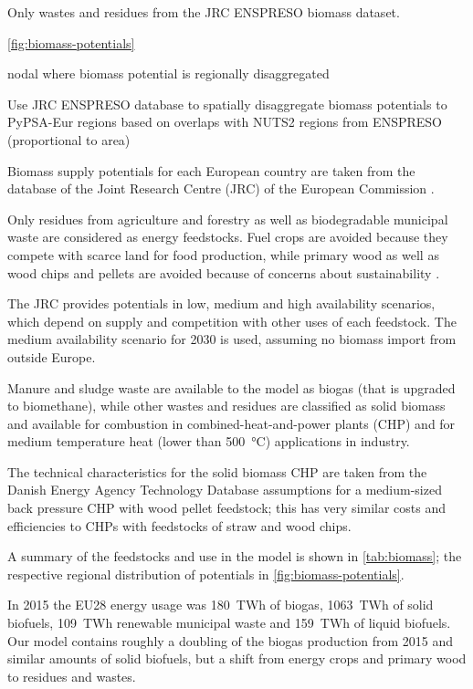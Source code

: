 Only wastes and residues from the JRC ENSPRESO biomass dataset.

\cref{fig:biomass-potentials}

nodal where biomass potential is regionally disaggregated

Use JRC ENSPRESO database to spatially disaggregate biomass potentials to
PyPSA-Eur regions based on overlaps with NUTS2 regions from ENSPRESO
(proportional to area)

Biomass supply potentials for each European country are taken from the database
of the Joint Research Centre (JRC) of the European Commission
.

Only residues from agriculture and forestry as well as
biodegradable municipal waste are considered as energy feedstocks. Fuel crops
are avoided because they compete with scarce land for food production, while
primary wood as well as wood chips and pellets are avoided because of concerns
about sustainability .

The JRC provides potentials in low,
medium and high availability scenarios, which depend on supply and competition
with other uses of each feedstock. The medium availability scenario for
2030 is used, assuming no biomass import from outside Europe.

Manure and sludge waste are available to the model as biogas (that is upgraded to
biomethane), while other wastes and residues are classified as solid biomass and
available for combustion in combined-heat-and-power plants (CHP) and for medium
temperature heat (lower than \SI{500}{\celsius}) applications in industry.

The technical
characteristics for the solid biomass CHP are taken from the Danish Energy
Agency Technology Database  assumptions for a medium-sized back
pressure CHP with wood pellet feedstock; this has very similar costs and
efficiencies to CHPs with feedstocks of straw and wood chips.

A summary of the feedstocks and use in the model is shown in \cref{tab:biomass}; the respective regional distribution of potentials in \cref{fig:biomass-potentials}.

In 2015 the EU28 energy
usage was 180~TWh of biogas, 1063~TWh of solid biofuels, 109~TWh renewable
municipal waste and 159~TWh of liquid biofuels. Our model contains roughly a
doubling of the biogas production from 2015 and similar amounts of solid
biofuels, but a shift from energy crops and primary wood to residues and wastes.

